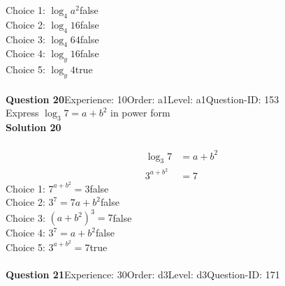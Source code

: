 \documentclass{article}
\begin{document}
Choice 1: \hspace{20pt}$\log_{4}a^2$\hspace{20pt}false\\
Choice 2: \hspace{20pt}$\log_{4}16$\hspace{20pt}false\\
Choice 3: \hspace{20pt}$\log_{4}64$\hspace{20pt}false\\
Choice 4: \hspace{20pt}$\log_{y}16$\hspace{20pt}false\\
Choice 5: \hspace{20pt}$\log_{y}4$\hspace{20pt}true\\
\\[4pt]
\noindent\textbf{Question 20}\hspace{20pt}Experience: 10\hspace{20pt}Order: a1\hspace{20pt}Level: a1\hspace{20pt}Question-ID: 153\\[2pt]
Express $\log_{3}7=a+b^2$ in power form\\[4pt]
\noindent\textbf{Solution 20}\\[2pt]
\\[-35pt]\begin{align*}
\log_{3}7&=a+b^2\\[2pt]
3^{a+b^2}&=7
\end{align*}
Choice 1: \hspace{20pt}$7^{a+b^2}=3$\hspace{20pt}false\\
Choice 2: \hspace{20pt}$3^7=7a+b^2$\hspace{20pt}false\\
Choice 3: \hspace{20pt}$(a+b^2)^3=7$\hspace{20pt}false\\
Choice 4: \hspace{20pt}$3^{7}=a+b^2$\hspace{20pt}false\\
Choice 5: \hspace{20pt}$3^{a+b^2}=7$\hspace{20pt}true\\
\\[4pt]
\noindent\textbf{Question 21}\hspace{20pt}Experience: 30\hspace{20pt}Order: d3\hspace{20pt}Level: d3\hspace{20pt}Question-ID: 171\\[2pt]
\end{document}
